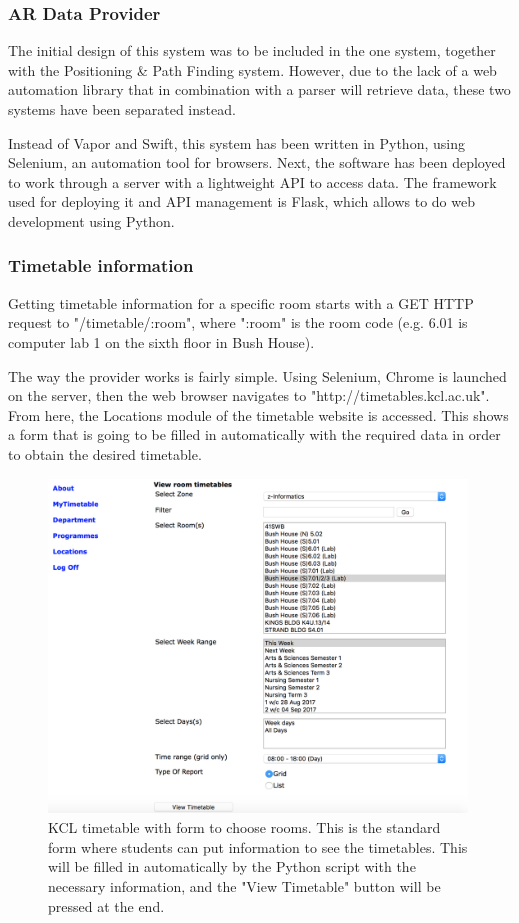 \subsubsection{AR Data Provider}

The initial design of this system was to be included in the one system, together with the Positioning \& Path Finding system. However, due to the lack of a web automation library that in combination with a parser will retrieve data, these two systems have been separated instead.

Instead of Vapor and Swift, this system has been written in Python, using Selenium, an automation tool for browsers. Next, the software has been deployed to work through a server with a lightweight API to access data. The framework used for deploying it and API management is Flask, which allows to do web development using Python.

\subsubsection*{Timetable information}
Getting timetable information for a specific room starts with a GET HTTP request to "/timetable/:room", where ":room" is the room code (e.g. 6.01 is computer lab 1 on the sixth floor in Bush House). 

The way the provider works is fairly simple. Using Selenium, Chrome is launched on the server, then the web browser navigates to "http://timetables.kcl.ac.uk". From here, the Locations module of the timetable website is accessed. This shows a form that is going to be filled in automatically with the required data in order to obtain the desired timetable.

\begin{figure}[H]
    \centering
    \includegraphics[width=420px, height=335px]{Implementation&Testing/timetable.png}
    \centering
    \caption{KCL timetable with form to choose rooms. This is the standard form where students can put information to see the timetables. This will be filled in automatically by the Python script with the necessary information, and the "View Timetable" button will be pressed at the end.}
\end{figure}

